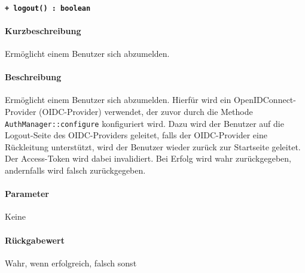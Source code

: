 \paragraph{\texttt{+ logout() : boolean}}%
\paragraph*{Kurzbeschreibung}
Ermöglicht einem Benutzer sich abzumelden.
\paragraph*{Beschreibung}
Ermöglicht einem Benutzer sich abzumelden.
Hierfür wird ein OpenIDConnect-Provider (OIDC-Provider) verwendet, der zuvor durch die Methode \verb#AuthManager::configure# konfiguriert wird.
Dazu wird der Benutzer auf die Logout-Seite des OIDC-Providers geleitet, falls der OIDC-Provider eine Rückleitung unterstützt, wird der Benutzer wieder zurück zur Startseite geleitet.
Der Access-Token wird dabei invalidiert.
Bei Erfolg wird wahr zurückgegeben, andernfalls wird falsch zurückgegeben.
\paragraph*{Parameter}
Keine
\paragraph*{Rückgabewert}
Wahr, wenn erfolgreich, falsch sonst
